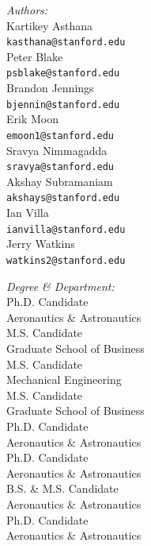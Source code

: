 \documentclass[11pt]{article}
\begin{document}
\begin{titlepage}
\begin{center}
\begin{minipage}{0.4\textwidth}
\begin{flushleft} \large
\emph{Authors:}\\[0.5cm]
Kartikey Asthana\\
\texttt{kasthana@stanford.edu}\\[0.5cm]
Peter Blake\\
\texttt{psblake@stanford.edu}\\[0.5cm]
Brandon Jennings\\
\texttt{bjennin@stanford.edu}\\[0.5cm]
Erik Moon\\
\texttt{emoon1@stanford.edu}\\[0.5cm]
Sravya Nimmagadda\\
\texttt{sravya@stanford.edu}\\[0.5cm]
Akshay Subramaniam\\
\texttt{akshays@stanford.edu}\\[0.5cm]
Ian Villa\\
\texttt{ianvilla@stanford.edu}\\[0.5cm]
Jerry Watkins\\
\texttt{watkins2@stanford.edu}\\[0.5cm]
\end{flushleft}
\end{minipage}
\begin{minipage}{0.4\textwidth}
\begin{flushright} \large
\emph{Degree \& Department:} \\[0.5cm]
Ph.D. Candidate\\
Aeronautics \& Astronautics\\[0.5cm]
M.S. Candidate\\
Graduate School of Business\\[0.5cm]
M.S. Candidate\\
Mechanical Engineering\\[0.5cm]
M.S. Candidate\\
Graduate School of Business\\[0.5cm]
Ph.D. Candidate\\
Aeronautics \& Astronautics\\[0.5cm]
Ph.D. Candidate\\
Aeronautics \& Astronautics\\[0.5cm]
B.S. \& M.S. Candidate\\
Aeronautics \& Astronautics\\[0.5cm]
Ph.D. Candidate\\
Aeronautics \& Astronautics\\[0.5cm]
\end{flushright}
\end{minipage}
\end{center}
\end{titlepage}
\end{document}
